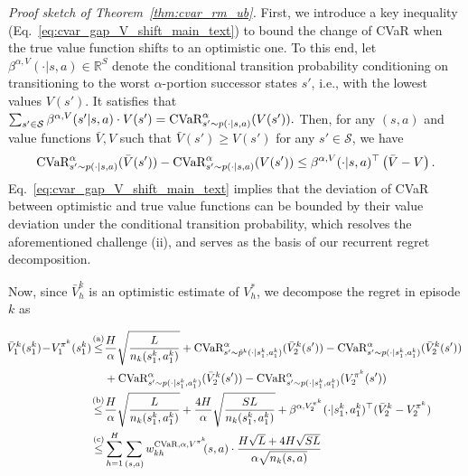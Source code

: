 \documentclass{article} %
\newcommand{\R}{\mathbb{R}}
\newcommand{\cS}{\mathcal{S}}
\newcommand{\sbr}[1]{\left( #1 \right)}
\newcommand{\cvar}{\textup{CVaR}}
\begin{document}
	
	\emph{Proof sketch of Theorem~\ref{thm:cvar_rm_ub}.} First, we introduce a key inequality (Eq.~\eqref{eq:cvar_gap_V_shift_main_text}) to bound the change of CVaR when the true value function shifts to an optimistic one. To this end, let $\beta^{\alpha,V}(\cdot|s,a) \in \R^{S}$ denote the conditional transition probability conditioning on transitioning to the worst $\alpha$-portion successor states $s'$,  i.e., with the lowest values $V(s')$. It satisfies that
	$
	\sum_{s' \in \cS} \beta^{\alpha,V}(s'|s,a) \cdot V(s') = \cvar^{\alpha}_{s' \sim p(\cdot|s,a)}(V(s')) .
	$
	Then, for any $(s,a)$ and value functions $\bar{V}, V$ such that $\bar{V}(s') \geq V(s')$ for any $s' \in \cS$, we have
	\begin{align}
		\cvar^{\alpha}_{s' \sim p(\cdot|s,a)}(\bar{V}(s')) - \cvar^{\alpha}_{s' \sim p(\cdot|s,a)}(V(s')) \leq \beta^{\alpha,V}(\cdot|s,a)^\top \sbr{\bar{V}-V} . \label{eq:cvar_gap_V_shift_main_text}
	\end{align}
	Eq.~\eqref{eq:cvar_gap_V_shift_main_text} implies that the deviation of CVaR between optimistic and true value functions can be bounded by their value deviation under the conditional transition probability, which resolves the aforementioned challenge (ii), and serves as the basis of our recurrent regret decomposition. 
	
	Now, since $\bar{V}^k_h$ is an optimistic estimate of $V^{*}_h$, we decompose the regret in episode $k$ as
	
	\vspace*{-1em}
	\begin{align} 
		\!\bar{V}^k_1(s^k_1) \!-\! V^{\pi^k}_1(s^k_1)
		\!\overset{\textup{(a)}}{\leq} &  \frac{H}{\alpha}\sqrt{\frac{L}{n_k(s^k_1,a^k_1)}}+\cvar^{\alpha}_{s' \sim \hat{p}^k(\cdot|s^k_1,a^k_1)}(\bar{V}^k_{2}(s')) - \cvar^{\alpha}_{s' \sim p(\cdot|s^k_1,a^k_1)}(\bar{V}^k_{2}(s')) \nonumber\\& + \cvar^{\alpha}_{s' \sim p(\cdot|s^k_1,a^k_1)}(\bar{V}^k_{2}(s')) - \cvar^{\alpha}_{s' \sim p(\cdot|s^k_1,a^k_1)}(V^{\pi^k}_{2}(s'))
		\nonumber\\
		\overset{\textup{(b)}}{\leq} &  \frac{H}{\alpha}\sqrt{\frac{L}{n_k(s^k_1,a^k_1)}}+ \frac{4H}{\alpha}\sqrt{\frac{SL}{n_k(s^k_1,a^k_1)}} +  \beta^{\alpha,V^{\pi^k}_{2}}(\cdot|s^k_1,a^k_1)^\top (\bar{V}^k_{2} - V^{\pi^k}_{2})
		\nonumber\\
		\overset{\textup{(c)}}{\leq} & \sum_{h=1}^{H} \sum_{(s,a)} w^{\cvar,\alpha,V^{\pi^k}}_{kh}\!\!(s,a) \cdot \frac{H\sqrt{L}+4H\sqrt{SL}}{\alpha \sqrt{n_k(s,a)}} 	\label{eq:regret_per_episode_main_text}
	\end{align}
	\vspace*{-1em}
	
\end{document}
